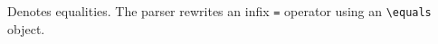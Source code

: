
Denotes equalities. The parser rewrites an infix \verb|=| operator
using an \verb|\equals| object.



